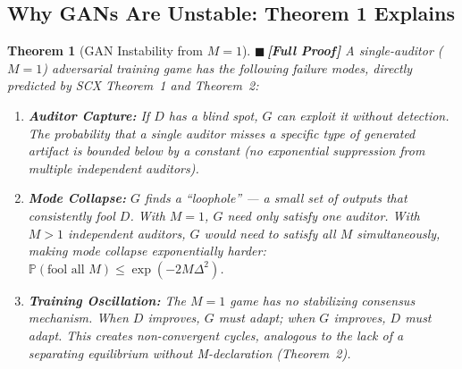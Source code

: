 \documentclass[12pt,a4paper]{article}
\newtheorem{theorem}{Theorem}[section]
\theoremstyle{definition}
\newcommand{\rigorFull}{{\color{rigorcolor}$\blacksquare$\,\textbf{[Full Proof]}}}
\newcommand{\SCX}{\textsc{SCX}}
\newcommand{\Pbb}{\mathbb{P}}
\begin{document}
\subsection{Why GANs Are Unstable: Theorem 1 Explains}

\begin{theorem}[GAN Instability from $M=1$]\label{thm:gan_instability}
\rigorFull
A single-auditor ($M=1$) adversarial training game has the following failure modes, directly predicted by \SCX{} Theorem~1 and Theorem~2:

\begin{enumerate}[label=(\roman*)]
    \item \textbf{Auditor Capture:} If $D$ has a blind spot, $G$ can exploit it without detection. The probability that a single auditor misses a specific type of generated artifact is bounded below by a constant (no exponential suppression from multiple independent auditors).
    \item \textbf{Mode Collapse:} $G$ finds a ``loophole'' — a small set of outputs that consistently fool $D$. With $M=1$, $G$ need only satisfy one auditor. With $M>1$ independent auditors, $G$ would need to satisfy all $M$ simultaneously, making mode collapse exponentially harder: $\Pbb(\text{fool all } M) \le \exp(-2M\Delta^2)$.
    \item \textbf{Training Oscillation:} The $M=1$ game has no stabilizing consensus mechanism. When $D$ improves, $G$ must adapt; when $G$ improves, $D$ must adapt. This creates non-convergent cycles, analogous to the lack of a separating equilibrium without M-declaration (Theorem~2).
\end{enumerate}
\end{theorem}
\end{document}
